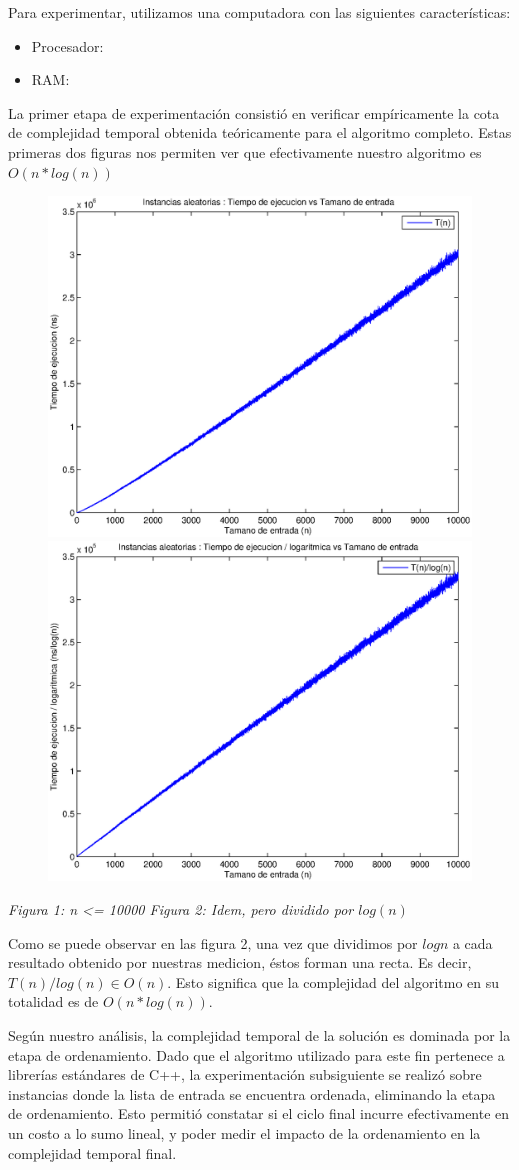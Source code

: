 Para experimentar, utilizamos una computadora con las siguientes características:

\begin{itemize}
 \item Procesador: 
 \item RAM: 
\end{itemize}

La primer etapa de experimentación consistió en verificar empíricamente la cota de complejidad temporal obtenida teóricamente para el algoritmo completo. Estas primeras dos figuras nos permiten ver que efectivamente nuestro algoritmo es $O(n * log(n))$

\begin{figure}[H]
    \includegraphics[width=0.5\linewidth]{problema1/graficos/problema1_aleatoria_10000.eps}
    \includegraphics[width=0.5\linewidth]{problema1/graficos/problema1_aleatoria_10000_div_logn.eps}
\end{figure}
\emph{\hspace{2,5cm}Figura 1: n <= 10000 \hspace{3cm}Figura 2: Idem, pero dividido por $log(n)$}

Como se puede observar en las figura 2, una vez que dividimos por $log n$ a cada resultado obtenido por nuestras medicion, éstos forman una recta. Es decir, $T(n)/log(n) \in O(n)$. Esto significa que la complejidad del algoritmo en su totalidad es de $O(n * log(n))$.

Según nuestro análisis, la complejidad temporal de la solución es dominada por la etapa de ordenamiento. Dado que el algoritmo utilizado para este fin pertenece a librerías estándares de C++, la experimentación subsiguiente se realizó sobre instancias donde la lista de entrada se encuentra ordenada, eliminando la etapa de ordenamiento. Esto permitió constatar si el ciclo final incurre efectivamente en un costo a lo sumo lineal, y poder medir el impacto de la ordenamiento en la complejidad temporal final.

